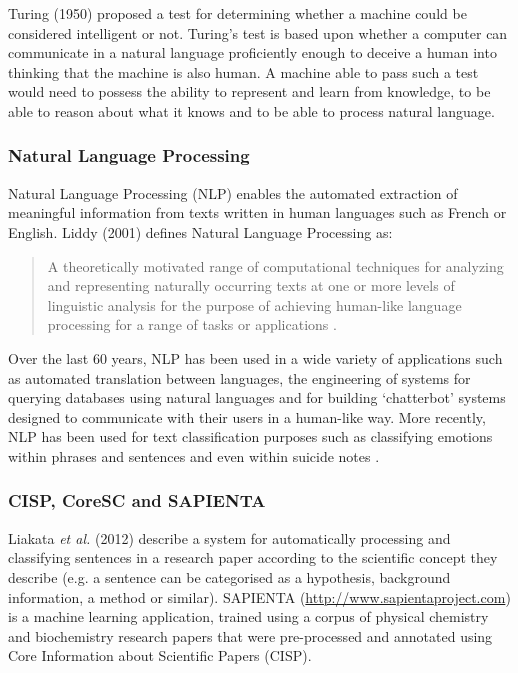 \documentclass[12pt,a4paper]{article}
\begin{document}
Turing (1950) proposed a test for determining whether a machine could be
considered intelligent or not\cite{turing1950computing}. Turing's test is based
upon whether a computer can communicate in a natural language proficiently
enough to deceive a human into thinking that the machine is also human. A
machine able to pass such a test would need to possess the ability to represent
and learn from knowledge, to be able to reason about what it knows and to be
able to process natural language\cite{russell2010artificial}. 

\subsubsection{Natural Language Processing}

Natural Language Processing (NLP)  enables the automated extraction of
meaningful information from texts written in human languages such as French or
English. Liddy (2001) defines Natural Language Processing as:

\begin{quotation} 
A theoretically motivated range of computational techniques for analyzing and
representing naturally occurring texts at one or more levels of linguistic
analysis for the purpose of achieving human-like language processing for a
range of tasks or applications \cite{liddy2001natural}.  
\end{quotation}

Over the last 60 years, NLP has been used in a wide variety of applications
such as automated translation between languages\cite{hutchins2004first}, the
engineering of systems for querying databases using natural languages
\cite{rao2010natural} and for building `chatterbot' systems designed to
communicate with their users in a human-like way\cite{Alfonsi2006}.
More recently, NLP has been used for text classification purposes such as
classifying emotions within phrases and sentences \cite{Wilson05Polarity} and
even within suicide notes \cite{citeulike:11077287}.


\subsubsection{CISP, CoreSC and SAPIENTA}

Liakata \emph{et al.} (2012) describe a system for automatically processing and
classifying sentences in a research paper according to the scientific concept
they describe (e.g. a sentence can be categorised as a hypothesis, background
information, a method or similar)\cite{citeulike:10444769}. SAPIENTA
(\url{http://www.sapientaproject.com}) is a machine learning application,
trained using a corpus of physical chemistry and biochemistry research papers
that were pre-processed and annotated using Core Information about Scientific
Papers (CISP)\cite{LIAKATA10.644}. 
\end{document}
